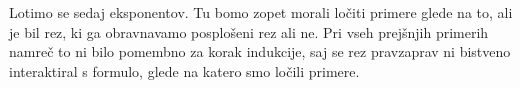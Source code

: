 \begin{prooftree}

\end{prooftree}
\dol
\begin{prooftree}

\end{prooftree}
Lotimo se sedaj eksponentov. Tu bomo zopet morali ločiti primere glede na to, ali je bil rez, ki ga obravnavamo posplošeni rez ali ne. Pri vseh prejšnjih primerih namreč to ni bilo pomembno za korak indukcije, saj se rez pravzaprav ni bistveno interaktiral s formulo, glede na katero smo ločili primere.
